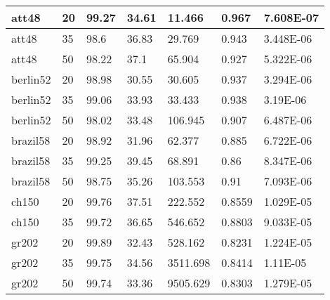 \documentclass{llncs}
\begin{document}
\begin{center}
\begin{longtable}{|l|l|l|l|l|l|l|}
\hline	att48	&	20	&	99.27	&	34.61	&	11.466	&	0.967	&	7.608E-07	\\
\hline	att48	&	35	&	98.6	&	36.83	&	29.769	&	0.943	&	3.448E-06	\\
\hline	att48	&	50	&	98.22	&	37.1	&	65.904	&	0.927	&	5.322E-06	\\
\hline	berlin52	&	20	&	98.98	&	30.55	&	30.605	&	0.937	&	3.294E-06	\\
\hline	berlin52	&	35	&	99.06	&	33.93	&	33.433	&	0.938	&	3.19E-06	\\
\hline	berlin52	&	50	&	98.02	&	33.48	&	106.945	&	0.907	&	6.487E-06	\\
\hline	brazil58	&	20	&	98.92	&	31.96	&	62.377	&	0.885	&	6.722E-06	\\
\hline	brazil58	&	35	&	99.25	&	39.45	&	68.891	&	0.86	&	8.347E-06	\\
\hline	brazil58	&	50	&	98.75	&	35.26	&	103.553	&	0.91	&	7.093E-06	\\
\hline	ch150	&	20	&	99.76	&	37.51	&	222.552	&	0.8559	&	1.029E-05	\\
\hline	ch150	&	35	&	99.72	&	36.65	&	546.652	&	0.8803	&	9.033E-05	\\
\hline	gr202	&	20	&	99.89	&	32.43	&	528.162	&	0.8231	&	1.224E-05	\\
\hline	gr202	&	35	&	99.75	&	34.56	&	3511.698	&	0.8414	&	1.11E-05	\\
\hline	gr202	&	50	&	99.74	&	33.36	&	9505.629	&	0.8303	&	1.279E-05	\\

\end{longtable}
\end{center}
\end{document}
